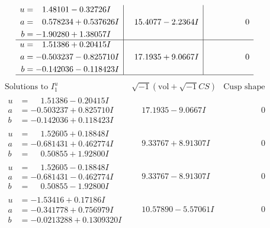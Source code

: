 \documentclass[1p]{elsarticle_modified}
\theoremstyle{definition}
\newcommand{\I}{\sqrt{-1}}
\begin{document}
$$\begin{array}{c|c|c}
\begin{aligned}
u &= \phantom{-}1.48101 - 0.32726 I \\
a &= \phantom{-}0.578234 + 0.537626 I \\
b &= -1.90280 + 1.38057 I\end{aligned}
 & \phantom{-}15.4077 - 2.2364 I & \phantom{-0.000000 } 0 \\ \hline\begin{aligned}
u &= \phantom{-}1.51386 + 0.20415 I \\
a &= -0.503237 - 0.825710 I \\
b &= -0.142036 - 0.118423 I\end{aligned}
 & \phantom{-}17.1935 + 9.0667 I & \phantom{-0.000000 } 0\\
 \hline 
 \end{array}$$\newpage$$\begin{array}{c|c|c}  
\text{Solutions to }I^u_{1}& \I (\text{vol} + \sqrt{-1}CS) & \text{Cusp shape}\\
 \hline 
\begin{aligned}
u &= \phantom{-}1.51386 - 0.20415 I \\
a &= -0.503237 + 0.825710 I \\
b &= -0.142036 + 0.118423 I\end{aligned}
 & \phantom{-}17.1935 - 9.0667 I & \phantom{-0.000000 } 0 \\ \hline\begin{aligned}
u &= \phantom{-}1.52605 + 0.18848 I \\
a &= -0.681431 + 0.462774 I \\
b &= \phantom{-}0.50855 + 1.92800 I\end{aligned}
 & \phantom{-}9.33767 + 8.91307 I & \phantom{-0.000000 } 0 \\ \hline\begin{aligned}
u &= \phantom{-}1.52605 - 0.18848 I \\
a &= -0.681431 - 0.462774 I \\
b &= \phantom{-}0.50855 - 1.92800 I\end{aligned}
 & \phantom{-}9.33767 - 8.91307 I & \phantom{-0.000000 } 0 \\ \hline\begin{aligned}
u &= -1.53416 + 0.17186 I \\
a &= -0.341778 + 0.756979 I \\
b &= -0.0213288 + 0.1309320 I\end{aligned}
 & \phantom{-}10.57890 - 5.57061 I & \phantom{-0.000000 } 0 \\ \hline\begin{aligned}

\end{aligned}
\end{array}$$
\end{document}
